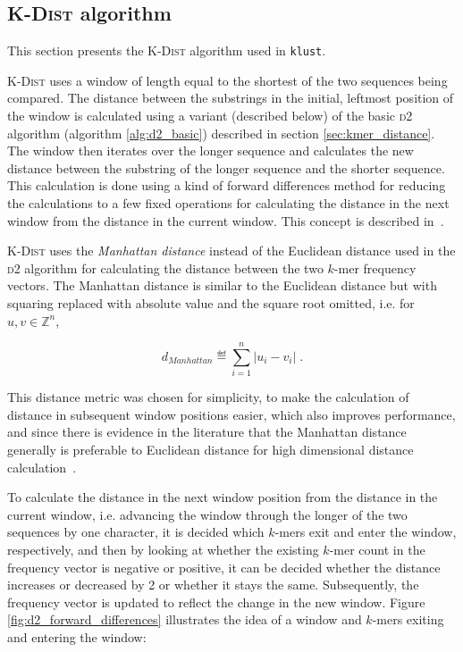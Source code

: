 \subsection{\textsc{K-Dist} algorithm}

This section presents the \textsc{K-Dist} algorithm used in \texttt{klust}.

\textsc{K-Dist} uses a window of length equal to the shortest of the two
sequences being compared. The distance between the substrings in the initial,
leftmost position of the window is calculated using a variant (described below)
of the basic \textsc{d2} algorithm (algorithm \ref{alg:d2_basic}) described in
section \ref{sec:kmer_distance}. The window then iterates over the longer
sequence and calculates the new distance between the substring of the longer
sequence and the shorter sequence.  This calculation is done using a kind of
forward differences method for reducing the calculations to a few fixed
operations for calculating the distance in the next window from the distance in
the current window. This concept is described in~\cite{hazelhurst}.

\textsc{K-Dist} uses the \emph{Manhattan distance} instead of the Euclidean
distance used in the \textsc{d2} algorithm for calculating the distance between
the two $k$-mer frequency vectors. The Manhattan distance is similar to the
Euclidean distance but with squaring replaced with absolute value and the
square root omitted, i.e.  for $u, v \in \mathbb{Z}^n$,

\begin{equation}
  d_{Manhattan} \eqdef \sum_{i=1}^{n} |u_i - v_i| \;.
\end{equation}

This distance metric was chosen for simplicity, to make the calculation of
distance in subsequent window positions easier, which also improves
performance, and since there is evidence in the literature that the Manhattan
distance generally is preferable to Euclidean distance for high dimensional
distance calculation~\cite{aggarwal}.  %

To calculate the distance in the next window position from the distance in the
current window, i.e. advancing the window through the longer of the two
sequences by one character, it is decided which $k$-mers exit and enter the
window, respectively, and then by looking at whether the existing $k$-mer count
in the frequency vector is negative or positive, it can be decided whether the
distance increases or decreased by 2 or whether it stays the same.
Subsequently, the frequency vector is updated to reflect the change in the new
window. Figure \ref{fig:d2_forward_differences} illustrates the idea of a
window and $k$-mers exiting and entering the window:

